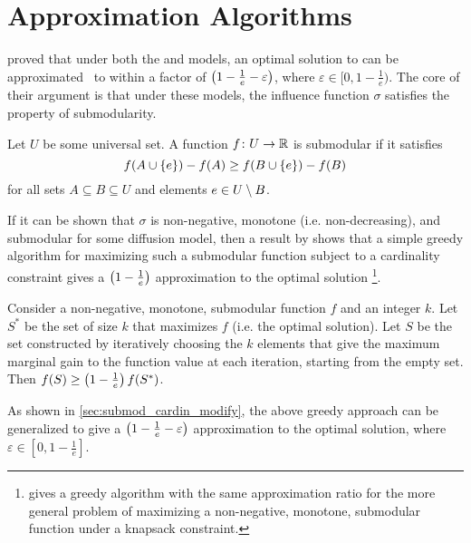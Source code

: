 \section{Approximation Algorithms}
\label{sec:approx_algs}
\citet{kempe2003maximizing} proved that under both the \ltmodel{} and \icmodel{} models, an optimal solution to \infmax{} can be approximated \
to within a factor of $\left( 1 - \frac{1}{e} - \varepsilon \right)$, where $\varepsilon \in [0, 1 - \frac{1}{e})$. The core of their argument is that
under these models, the influence function $\sigma$ satisfies the property of submodularity. 

\begin{definition}[Submodularity]
    \label{def:submod}
    Let $U$ be some universal set. A function $f\colon U \to \mathbb{R}$ is submodular if it satisfies 
    \begin{equation}
        f \! \left( A \cup \left\{ e \right\} \right) - f \! \left( A \right) \geq  f \! \left( B \cup \left\{ e \right\} \right) - f \! \left( B \right)
        \label{eq:submod}
    \end{equation} 
    for all sets $A \subseteq B \subseteq U$ and elements $e \in U \setminus B$. 
\end{definition}
 
If it can be shown that $\sigma$ is non-negative, monotone (i.e.\! non-decreasing), and submodular for some diffusion model, then a result by \citet{nemhauser1978analysis} shows that a simple greedy algorithm for maximizing such a submodular function subject to a cardinality constraint gives a $\left( 1 - \frac{1}{e} \right)$ approximation 
to the optimal solution \footnote{\cite{sviridenko2004note} gives a greedy algorithm with the same approximation ratio for the more general problem of maximizing a non-negative, monotone, submodular function under a knapsack constraint.}. 

\begin{theorem}
    Consider a non-negative, monotone, submodular function $f$ and an integer $k$. Let $S^*$ be the set of size $k$ that maximizes $f$ (i.e.\! the optimal solution). 
    Let $S$ be the set constructed by iteratively choosing the $k$ elements that give the maximum marginal gain to the function value at each iteration, starting from the empty set. Then $f \! \left( S \right) \geq \left( 1 - \frac{1}{e} \right)f \! \left( S^* \right)$. 
    \label{thm:submod_cardin}
\end{theorem}

As shown in \cref{sec:submod_cardin_modify}, the above greedy approach can be generalized
to give a $\left( 1 - \frac{1}{e} - \varepsilon \right)$ approximation to the optimal solution, where $\varepsilon \in [0, 1 - \frac{1}{e}]$. 

